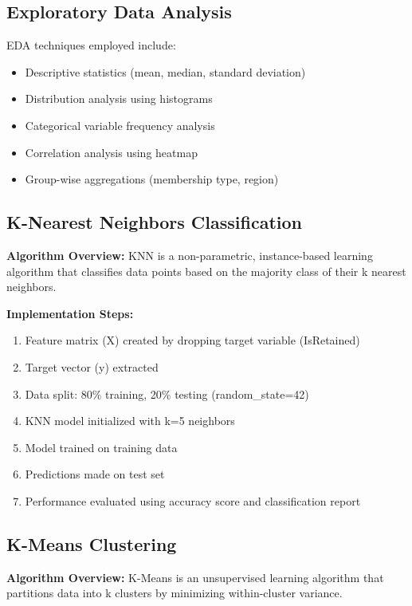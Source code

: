 \documentclass[12pt,a4paper]{article}
\begin{document}
\subsection{Exploratory Data Analysis}
EDA techniques employed include:
\begin{itemize}
    \item Descriptive statistics (mean, median, standard deviation)
    \item Distribution analysis using histograms
    \item Categorical variable frequency analysis
    \item Correlation analysis using heatmap
    \item Group-wise aggregations (membership type, region)
\end{itemize}

\subsection{K-Nearest Neighbors Classification}
\textbf{Algorithm Overview:} KNN is a non-parametric, instance-based learning algorithm that classifies data points based on the majority class of their k nearest neighbors.

\textbf{Implementation Steps:}
\begin{enumerate}
    \item Feature matrix (X) created by dropping target variable (IsRetained)
    \item Target vector (y) extracted
    \item Data split: 80\% training, 20\% testing (random\_state=42)
    \item KNN model initialized with k=5 neighbors
    \item Model trained on training data
    \item Predictions made on test set
    \item Performance evaluated using accuracy score and classification report
\end{enumerate}

\subsection{K-Means Clustering}
\textbf{Algorithm Overview:} K-Means is an unsupervised learning algorithm that partitions data into k clusters by minimizing within-cluster variance.
\end{document}

